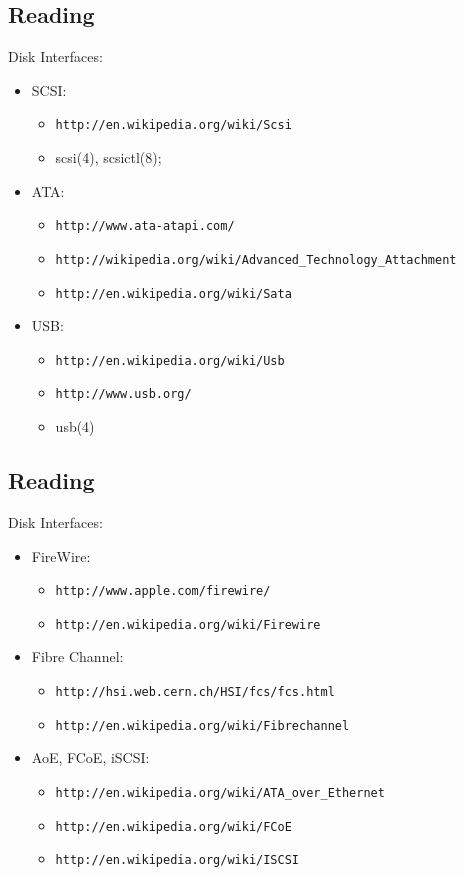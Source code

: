 \documentclass[xga]{xdvislides}
\begin{document}
\subsection{Reading}
Disk Interfaces:
\begin{itemize}
	\item SCSI:
		\begin{itemize}
			\item \verb+http://en.wikipedia.org/wiki/Scsi+
			\item scsi(4), scsictl(8);
		\end{itemize}
	\item ATA:
		\begin{itemize}
			\item \verb+http://www.ata-atapi.com/+
			\item \verb+http://wikipedia.org/wiki/Advanced_Technology_Attachment+
			\item \verb+http://en.wikipedia.org/wiki/Sata+
		\end{itemize}
	\item USB:
		\begin{itemize}
			\item \verb+http://en.wikipedia.org/wiki/Usb+
			\item \verb+http://www.usb.org/+
			\item usb(4)
		\end{itemize}
\end{itemize}

\subsection{Reading}
Disk Interfaces:
\begin{itemize}
	\item FireWire:
		\begin{itemize}
			\item \verb+http://www.apple.com/firewire/+
			\item \verb+http://en.wikipedia.org/wiki/Firewire+
		\end{itemize}
	\item Fibre Channel:
		\begin{itemize}
			\item \verb+http://hsi.web.cern.ch/HSI/fcs/fcs.html+
			\item \verb+http://en.wikipedia.org/wiki/Fibrechannel+
		\end{itemize}
	\item AoE, FCoE, iSCSI:
		\begin{itemize}
			\item \verb+http://en.wikipedia.org/wiki/ATA_over_Ethernet+
			\item \verb+http://en.wikipedia.org/wiki/FCoE+
			\item \verb+http://en.wikipedia.org/wiki/ISCSI+
		\end{itemize}
\end{itemize}
\end{document}
